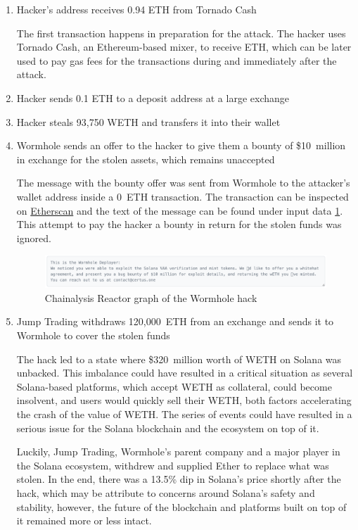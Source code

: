 \documentclass{article}
\begin{document}
\begin{enumerate}
\item Hacker's address receives 0.94 ETH from Tornado Cash

The first transaction happens in preparation for the attack. The hacker uses Tornado Cash, an Ethereum-based mixer, to receive ETH, which can be later used to pay gas fees for the transactions during and immediately after the attack. 

\item Hacker sends 0.1 ETH to a deposit address at a large exchange
\item Hacker steals 93,750 WETH and transfers it into their wallet
\item Wormhole sends an offer to the hacker to give them a bounty of \$10~million in exchange for the stolen assets, which remains unaccepted

The message with the bounty offer was sent from Wormhole to the attacker's wallet address inside a 0~ETH transaction. The transaction can be inspected on \href{https://etherscan.io/tx/0x2d8b7901bff18ae6abe1a50aebe44b70559f39ff357b21340843d368b9486859}{Etherscan} and the text of the message can be found under input data \ref{fig:bounty_offer}. This attempt to pay the hacker a bounty in return for the stolen funds was ignored.

\begin{figure}[ht!]
\centering
\includegraphics[width=\textwidth]{img/Bounty_offer.png}
\caption{\label{fig:bounty_offer}Chainalysis Reactor graph of the Wormhole hack \cite{hack_schema}}
\end{figure}

\item Jump Trading withdraws 120,000~ETH from an exchange and sends it to Wormhole to cover the stolen funds

The hack led to a state where \$320~million worth of WETH on Solana was unbacked. This imbalance could have resulted in a critical situation as several Solana-based platforms, which accept WETH as collateral, could become insolvent, and users would quickly sell their WETH, both factors accelerating the crash of the value of WETH. The series of events could have resulted in a serious issue for the Solana blockchain and the ecosystem on top of it. 

Luckily, Jump Trading, Wormhole’s parent company and a major player in the Solana ecosystem, withdrew and supplied Ether to replace what was stolen. In the end, there was a 13.5\% dip in Solana’s price shortly after the hack, which may be attribute to concerns around Solana's safety and stability, however, the future of the blockchain and platforms built on top of it remained more or less intact.
\end{enumerate}
\end{document}
